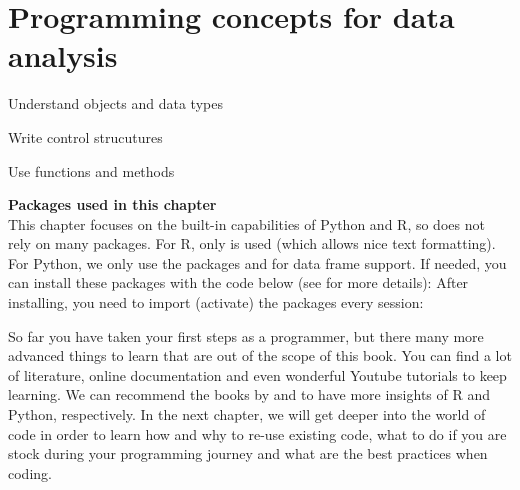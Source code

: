 \chapter{Programming concepts for data analysis}
\label{chap:programmingconcepts}

\begin{abstract}{Abstract}
  This chapter introduces readers to the basics of programming
  in Python and R. It
explains how to deal with objects, statements, expressions, variables
and different types of data, and shows how to create and understand
simple control structures such as loops and conditions.
\end{abstract}


\begin{objectives}
\item Understand objects and data types
\item Write control strucutures
\item Use functions and methods
\end{objectives}

\newpage
\begin{feature}
  \textbf{Packages used in this chapter}\\
  This chapter focuses on the built-in capabilities of Python and R,
  so does not rely on many packages.
  For R, only  is used (which allows nice text formatting).
  For Python, we only use the packages  and 
  for data frame support.
  If needed, you can install these packages with the code below
  (see  for more details):
  \noindent After installing, you need to import (activate) the packages every session:
\end{feature}








So far you have taken your first steps as a programmer, but there many
more advanced things to learn that are out of the scope of this
book. You can find a lot of literature, online documentation and even
wonderful Youtube tutorials to keep learning. We can recommend the
books by \cite{crawley2012r} and \cite{vanderplas2016python} to have
more insights of R and Python, respectively. In the next chapter, we
will get deeper into the world of code in order to learn how and why
to re-use existing code, what to do if you are stock during your
programming journey and what are the best practices when coding.
